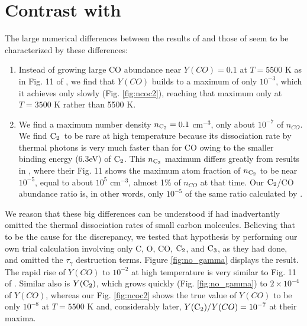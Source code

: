 \documentclass[manuscript]{aastex}
\newcommand{\ctwo}{{\rm C}_2}
\newcommand{\cthree}{{\rm C}_3}
\begin{document}
\section{Contrast with \citet{2009ApJ...703..642C,2010ApJ...713....1C}}

The large numerical differences between the results of
\citet{1999Sci...283.1290C,2001ApJ...562..480C}
and those of \citet{2009ApJ...703..642C,2010ApJ...713....1C}
seem to be characterized by these differences:
\begin{enumerate}

\item Instead of growing large CO abundance near $Y(CO)=0.1$ at $T=5500$ K
as in Fig. 11 of \citet{2009ApJ...703..642C}, we find that $Y(CO)$
builds to a maximum of only $10^{-3}$, which it achieves only slowly
(Fig. \ref{fig:ncoc2}), reaching that maximum only at $T=3500$ K rather
than 5500 K.

\item We find a maximum number density $n_{\ctwo} = 0.1$ cm$^{-3}$,
only about $10^{-7}$ of
$n_{CO}$. We find $\ctwo$\ to be rare at high temperature because its
dissociation rate by thermal photons is very much faster than for CO
owing to the smaller binding energy (6.3eV) of $\ctwo$. This $n_{\ctwo}$
maximum differs greatly from results in \citet{2009ApJ...703..642C},
where their Fig. 11 shows the maximum atom fraction of $n_{\ctwo}$ to be
near $10^{-5}$, equal to about $10^5$ cm$^{-3}$, almost 1\% of
$n_{CO}$ at that time. Our $\ctwo$/CO abundance ratio is,
in other words, only $10^{-5}$ of the same ratio calculated by
\citet{2009ApJ...703..642C}.

\end{enumerate}
We reason that these big differences can be understood if
\citet{2009ApJ...703..642C} had inadvertantly omitted the thermal
dissociation rates of small carbon molecules. Believing that to be the
cause for the discrepancy, we tested that hypothesis by performing our
own trial calculation involving only C, O, CO, $\ctwo$, and $\cthree$,
as they had done,
and omitted the $\tau_\gamma$ destruction terms.
Figure \ref{fig:no_gamma} displays the result.
The rapid rise of $Y(CO)$ to $10^{-2}$ at high temperature is very similar to
Fig. 11 of \citet{2009ApJ...703..642C}.
Similar also is $Y(\ctwo)$,
which grows quickly (Fig. \ref{fig:no_gamma}) to $2 \times 10^{-4}$ of $Y(CO)$,
whereas our Fig. \ref{fig:ncoc2} shows the true value of $Y(CO)$ to be
only $10^{-8}$ at $T=5500$ K and, considerably later,
$Y(\ctwo)/Y(CO) = 10^{-7}$ at their maxima. 
\end{document}
